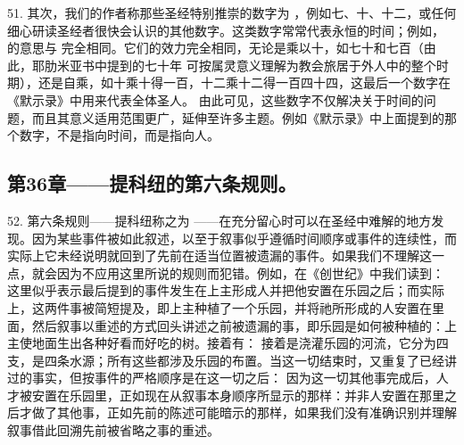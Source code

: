 51. 其次，我们的作者称那些圣经特别推崇的数字为 ，例如七、十、十二，或任何细心研读圣经者很快会认识的其他数字。这类数字常常代表永恒的时间；例如， 的意思与 完全相同。它们的效力完全相同，无论是乘以十，如七十和七百（由此，耶肋米亚书中提到的七十年 可按属灵意义理解为教会旅居于外人中的整个时期），还是自乘，如十乘十得一百，十二乘十二得一百四十四，这最后一个数字在《默示录》中用来代表全体圣人。 由此可见，这些数字不仅解决关于时间的问题，而且其意义适用范围更广，延伸至许多主题。例如《默示录》中上面提到的那个数字，不是指向时间，而是指向人。\par


\subsection{第36章——提科纽的第六条规则。}

52. 第六条规则——提科纽称之为 ——在充分留心时可以在圣经中难解的地方发现。因为某些事件被如此叙述，以至于叙事似乎遵循时间顺序或事件的连续性，而实际上它未经说明就回到了先前在适当位置被遗漏的事件。如果我们不理解这一点，就会因为不应用这里所说的规则而犯错。例如，在《创世纪》中我们读到： 这里似乎表示最后提到的事件发生在上主形成人并把他安置在乐园之后；而实际上，这两件事被简短提及，即上主种植了一个乐园，并将祂所形成的人安置在里面，然后叙事以重述的方式回头讲述之前被遗漏的事，即乐园是如何被种植的：上主使地面生出各种好看而好吃的树。接着有： 接着是浇灌乐园的河流，它分为四支，是四条水源；所有这些都涉及乐园的布置。当这一切结束时，又重复了已经讲过的事实，但按事件的严格顺序是在这一切之后： 因为这一切其他事完成后，人才被安置在乐园里，正如现在从叙事本身顺序所显示的那样：并非人安置在那里之后才做了其他事，正如先前的陈述可能暗示的那样，如果我们没有准确识别并理解叙事借此回溯先前被省略之事的重述。\par

